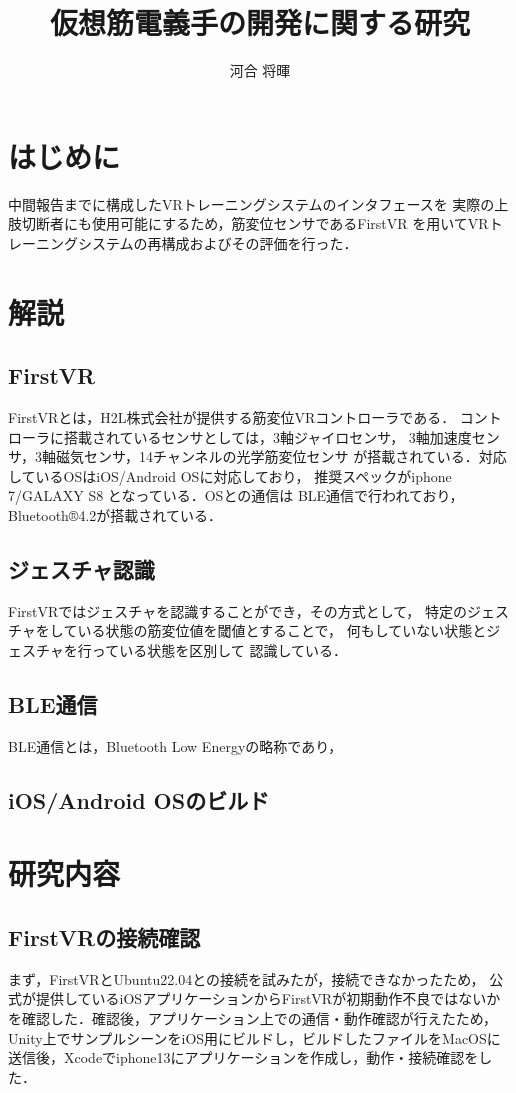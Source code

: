 \documentclass{ltjsarticle}
\title{仮想筋電義手の開発に関する研究}
\author{河合 将暉}
\begin{document}
\maketitle

\section{はじめに}
	中間報告までに構成したVRトレーニングシステムのインタフェースを
	実際の上肢切断者にも使用可能にするため，筋変位センサであるFirstVR
	を用いてVRトレーニングシステムの再構成およびその評価を行った．
\section{解説}
	\subsection{FirstVR}
		FirstVRとは，H2L株式会社が提供する筋変位VRコントローラである．
		コントローラに搭載されているセンサとしては，3軸ジャイロセンサ，
		3軸加速度センサ，3軸磁気センサ，14チャンネルの光学筋変位センサ
		が搭載されている．対応しているOSはiOS/Android OSに対応しており，
		推奨スペックがiphone 7/GALAXY S8 となっている．OSとの通信は
		BLE通信で行われており，Bluetooth®4.2が搭載されている．

	\subsection{ジェスチャ認識}
		FirstVRではジェスチャを認識することができ，その方式として，
		特定のジェスチャをしている状態の筋変位値を閾値とすることで，
		何もしていない状態とジェスチャを行っている状態を区別して
		認識している．
	\subsection{BLE通信}
		BLE通信とは，Bluetooth Low Energyの略称であり，
	\subsection{iOS/Android OSのビルド}

\section{研究内容}
	\subsection{FirstVRの接続確認}
		まず，FirstVRとUbuntu22.04との接続を試みたが，接続できなかったため，
		公式が提供しているiOSアプリケーションからFirstVRが初期動作不良ではないか
		を確認した．確認後，アプリケーション上での通信・動作確認が行えたため，
		Unity上でサンプルシーンをiOS用にビルドし，ビルドしたファイルをMacOSに
		送信後，Xcodeでiphone13にアプリケーションを作成し，動作・接続確認をした．
\end{document}
